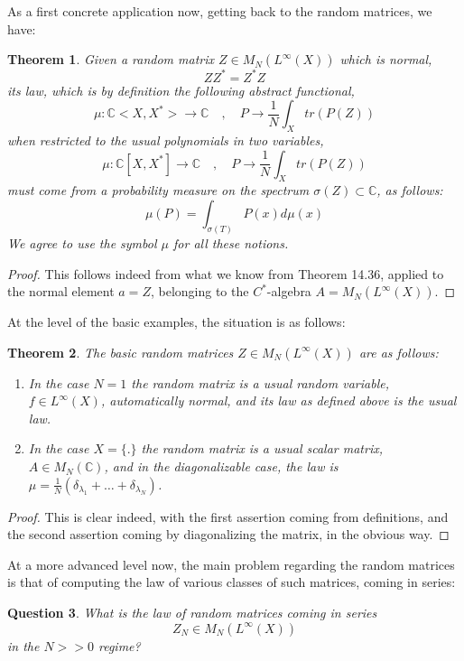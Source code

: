 \documentclass[12pt]{amsbook}
\newtheorem{theorem}{Theorem}[chapter]
\newtheorem{question}[theorem]{Question}
\begin{document}
As a first concrete application now, getting back to the random matrices, we have:

\begin{theorem}
Given a random matrix $Z\in M_N(L^\infty(X))$ which is normal, 
$$ZZ^*=Z^*Z$$
its law, which is by definition the following abstract functional,
$$\mu:\mathbb C<X,X^*>\to\mathbb C\quad,\quad 
P\to\frac{1}{N}\int_Xtr(P(Z))$$
when restricted to the usual polynomials in two variables,
$$\mu:\mathbb C[X,X^*]\to\mathbb C\quad,\quad 
P\to\frac{1}{N}\int_Xtr(P(Z))$$
must come from a probability measure on the spectrum $\sigma(Z)\subset\mathbb C$, as follows:
$$\mu(P)=\int_{\sigma(T)}P(x)d\mu(x)$$
We agree to use the symbol $\mu$ for all these notions.
\end{theorem}

\begin{proof}
This follows indeed from what we know from Theorem 14.36, applied to the normal element $a=Z$, belonging to the $C^*$-algebra $A=M_N(L^\infty(X))$.
\end{proof}

At the level of the basic examples, the situation is as follows:

\begin{theorem}
The basic random matrices $Z\in M_N(L^\infty(X))$ are as follows:
\begin{enumerate}
\item In the case $N=1$ the random matrix is a usual random variable, $f\in L^\infty(X)$, automatically normal, and its law as defined above is the usual law.

\item In the case $X=\{.\}$ the random matrix is a usual scalar matrix, $A\in M_N(\mathbb C)$, and in the diagonalizable case, the law is $\mu=\frac{1}{N}\left(\delta_{\lambda_1}+\ldots+\delta_{\lambda_N}\right)$.
\end{enumerate}
\end{theorem}

\begin{proof}
This is clear indeed, with the first assertion coming from definitions, and the second assertion coming by diagonalizing the matrix, in the obvious way.
\end{proof}

At a more advanced level now, the main problem regarding the random matrices is that of computing the law of various classes of such matrices, coming in series:

\begin{question}
What is the law of random matrices coming in series
$$Z_N\in M_N(L^\infty(X))$$
in the $N>>0$ regime?
\end{question}
\end{document}
